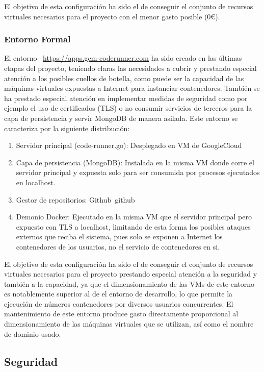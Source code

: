 \documentclass[a4paper,11pt]{book}
\begin{document}
El objetivo de esta configuración ha sido el de conseguir el conjunto de recursos virtuales necesarios para el proyecto con el menor gasto posible (0€).

\subsubsection{Entorno Formal}

El entorno  ~\url{https://apps.gcm-coderunner.com} ha sido creado en las últimas etapas del proyecto, teniendo claras las necesidades a cubrir y prestando especial atención a los posibles cuellos de botella, como puede ser la capacidad de las máquinas virtuales expuestas a Internet para instanciar contenedores.  También se ha prestado especial atención en implementar medidas de seguridad como por ejemplo el uso de certificados (TLS) o no consumir servicios de terceros para la capa de persistencia y servir MongoDB de manera asilada. Este entorno se caracteriza por la siguiente distribución: 

\begin{enumerate}
\item Servidor principal (code-runner.go): Desplegado en VM de GoogleCloud~\cite{gcp}
\item Capa de persistencia (MongoDB): Instalada en la misma VM donde corre el servidor principal y expuesta solo para ser consumida por procesos ejecutados en localhost. 
\item Gestor de repositorios: Github~github
\item Demonio Docker: Ejecutado en la misma VM que el servidor principal  pero expuesto con TLS a localhost, limitando de esta forma los posibles ataques externos que reciba el sistema, pues solo se exponen a Internet los contenedores de los usuarios, no el servicio de contenedores en si. 
\end{enumerate}


El objetivo de esta configuración ha sido el de conseguir el conjunto de recursos virtuales necesarios para el proyecto prestando especial atención a la seguridad y también a la capacidad, ya que el dimensionamiento de las VMs de este entorno es notablemente superior al de el entorno de desarrollo, lo que permite la ejecución de números contenedores por diversos usuarios concurrentes.  El mantenimiento de este entorno produce gasto directamente proporcional al dimensionamiento de las máquinas virtuales que se utilizan, así como el nombre de dominio usado. 

\subsection{Seguridad}
\end{document}
